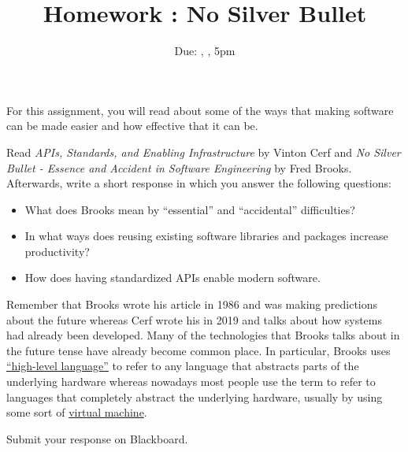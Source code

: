 \documentclass[12pt]{article}
\title{Homework \hwno: No Silver Bullet}
\date{Due: \dayofweekname{\duedate}{\duemonth}{\year}, \monthname[\duemonth] \duedate, 5pm}
\begin{document}
\maketitle

For this assignment, you will read about some of the ways that making software can be made easier and how effective that it can be.

Read \emph{APIs, Standards, and Enabling Infrastructure} by Vinton Cerf and \emph{No Silver Bullet - Essence and Accident in Software Engineering} by Fred Brooks.
Afterwards, write a short response in which you answer the following questions:

\begin{itemize}
	\item What does Brooks mean by ``essential'' and ``accidental'' difficulties?
	\item In what ways does reusing existing software libraries and packages increase productivity?
	\item How does having standardized APIs enable modern software.
\end{itemize}

Remember that Brooks wrote his article in 1986 and was making predictions about the future whereas Cerf wrote his in 2019 and talks about how systems had already been developed.
Many of the technologies that Brooks talks about in the future tense have already become common place.
In particular, Brooks uses \href{https://en.wikipedia.org/wiki/High-level_programming_language}{``high-level language''}  to refer to any language that abstracts parts of the underlying hardware whereas nowadays most people use the term to refer to languages that completely abstract the underlying hardware, usually by using some sort of \href{https://en.wikipedia.org/wiki/Virtual_machine}{virtual machine}.

Submit your response on Blackboard.
\end{document}
